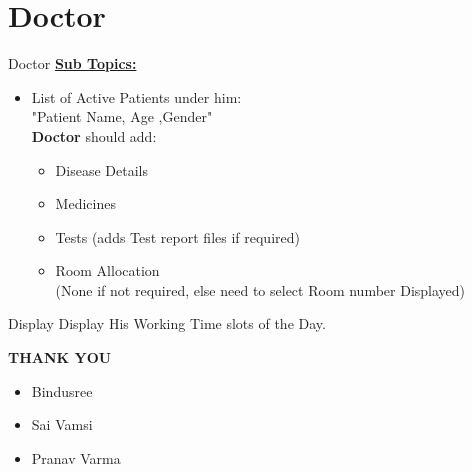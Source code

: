 \documentclass{beamer}
\begin{document}
\section{Doctor}
\begin{frame}{Doctor}
\underline{\textbf{Sub Topics:}}
\begin{itemize}
\item List of Active Patients under him:\\[6pt]
"Patient Name, Age ,Gender"\\[10pt]
\textbf{Doctor} should add:
\begin{itemize}
\item Disease Details
\item Medicines
\item Tests (adds Test report files if required)
\item Room Allocation\\
(None if not required, else need to select Room number Displayed)
\end{itemize}
\end{itemize}
\begin{exampleblock}{Display}
 Display His Working Time slots of the Day.
\end{exampleblock}
\end{frame}
\begin{frame}
\begin{center}
\begin{large}
\textbf{THANK YOU}
\end{large}
\end{center}
\begin{itemize}
\item Bindusree
\item Sai Vamsi
\item Pranav Varma 
\end{itemize}
\end{frame}
\end{document}
